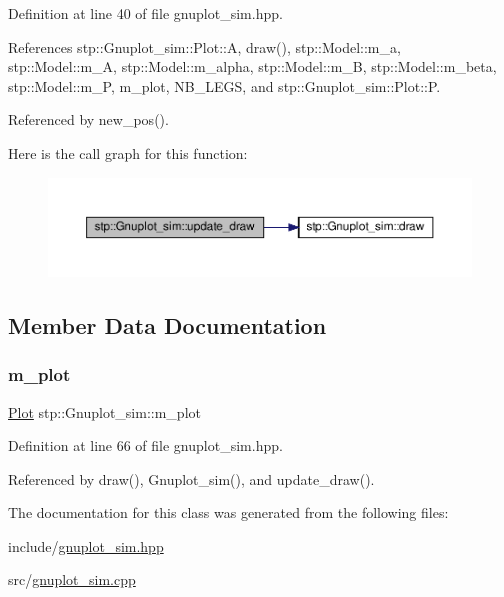 Definition at line 40 of file gnuplot\+\_\+sim.\+hpp.



References stp\+::\+Gnuplot\+\_\+sim\+::\+Plot\+::A, draw(), stp\+::\+Model\+::m\+\_\+a, stp\+::\+Model\+::m\+\_\+A, stp\+::\+Model\+::m\+\_\+alpha, stp\+::\+Model\+::m\+\_\+B, stp\+::\+Model\+::m\+\_\+beta, stp\+::\+Model\+::m\+\_\+P, m\+\_\+plot, N\+B\+\_\+\+L\+E\+GS, and stp\+::\+Gnuplot\+\_\+sim\+::\+Plot\+::P.



Referenced by new\+\_\+pos().

Here is the call graph for this function\+:\nopagebreak
\begin{figure}[H]
\begin{center}
\leavevmode
\includegraphics[width=350pt]{classstp_1_1_gnuplot__sim_a22d1793e471b78033080650a3701d2c4_cgraph}
\end{center}
\end{figure}


\subsection{Member Data Documentation}
\mbox{\label{classstp_1_1_gnuplot__sim_a5a546476a6b62ae119c3ed5da6b0623b}} 
\subsubsection{\texorpdfstring{m\+\_\+plot}{m\_plot}}
{\footnotesize\ttfamily \hyperlink{structstp_1_1_gnuplot__sim_1_1_plot}{Plot} stp\+::\+Gnuplot\+\_\+sim\+::m\+\_\+plot\hspace{0.3cm}{\ttfamily [private]}}



Definition at line 66 of file gnuplot\+\_\+sim.\+hpp.



Referenced by draw(), Gnuplot\+\_\+sim(), and update\+\_\+draw().



The documentation for this class was generated from the following files\+:\begin{DoxyCompactItemize}
\item 
include/\hyperlink{gnuplot__sim_8hpp}{gnuplot\+\_\+sim.\+hpp}\item 
src/\hyperlink{gnuplot__sim_8cpp}{gnuplot\+\_\+sim.\+cpp}\end{DoxyCompactItemize}

